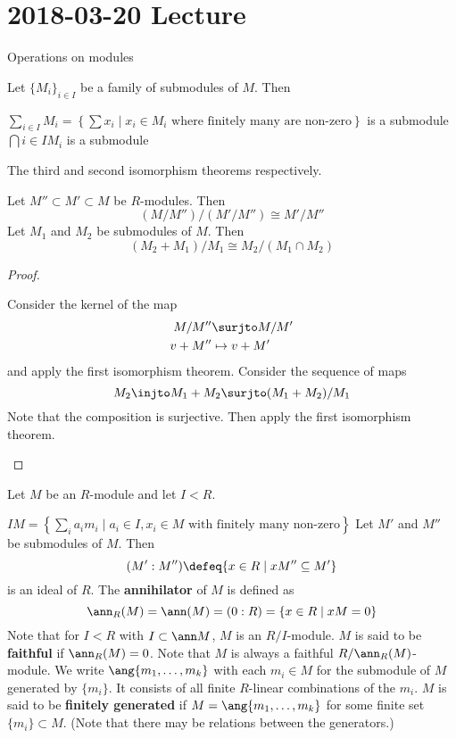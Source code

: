 \section{2018-03-20 Lecture}

Operations on modules

\begin{defn}
	Let $\{M_i\}_{i \in I}$ be a family of submodules of $M$.
	Then
	\begin{enum}
		\io $\displaystyle \sum_{i \in I} M_i = \left\{\sum x_i \mid x_i \in M_i \text{ where finitely many are non-zero}\right\}$ is a submodule
		\io $\displaystyle \bigcap{i \in I} M_i$ is a submodule
	\end{enum}
\end{defn}

\begin{prop}[1.5]
	The third and second isomorphism theorems respectively.
	\begin{enum}
		\io Let $M'' \subset M' \subset M$ be $R$-modules.
		Then
		\[(M/M'')/(M'/M'') \cong M'/M''\]
		\io Let $M_1$ and $M_2$ be submodules of $M$.
		Then
		\[(M_2+M_1)/M_1 \cong M_2/(M_1 \cap M_2)\]
	\end{enum}
\end{prop}

\begin{proof}
	\begin{enum}
		\io Consider the kernel of the map
		\begin{align*}
			M/M'' &\surjto M/M' \\
			v + M'' &\mapsto v + M'
		\end{align*}
		and apply the first isomorphism theorem.
		\io Consider the sequence of maps
		\[M_2 \injto M_1+M_2 \surjto (M_1+M_2)/M_1\]
		Note that the composition is surjective.
		Then apply the first isomorphism theorem.
	\end{enum}
\end{proof}

\begin{defn}[1.6]
	Let $M$ be an $R$-module and let $I<R$.
	\begin{enum}
		\io $\displaystyle IM = \left\{\sum_i a_im_i \mid a_i \in I, x_i \in M \text{ with finitely many non-zero} \right\}$
		\io Let $M'$ and $M''$ be submodules of $M$.
		Then
		\[(M':M'') \defeq \{x \in R \mid xM'' \subseteq M'\}\]
		is an ideal of $R$.
		\io The \textbf{annihilator} of $M$ is defined as
		\[\ann_R(M) = \ann(M) = (0:R) = \{x \in R \mid xM = 0\}\]
		Note that for $I<R$ with $I \subset \ann M$, $M$ is an $R/I$-module.
		\io $M$ is said to be \textbf{faithful} if $\ann_R(M) = 0$.
		Note that $M$ is always a faithful $R/\ann_R(M)$-module.
		\io We write $\ang{m_1,\ldots,m_k}$ with each $m_i \in M$ for the submodule of $M$ generated by $\{m_i\}$.
		It consists of all finite $R$-linear combinations of the $m_i$.
		\io $M$ is said to be \textbf{finitely generated} if $M=\ang{m_1,\ldots,m_k}$ for some finite set $\{m_i\} \subset M$.
		(Note that there may be relations between the generators.)
	\end{enum}
\end{defn}


